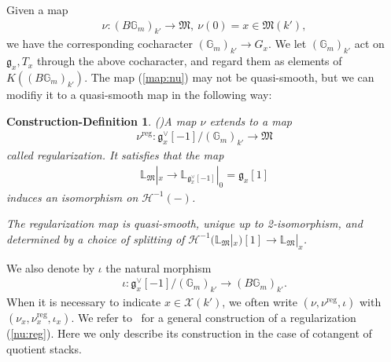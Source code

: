\documentclass [11pt,oneside,a4paper,mathscr]{amsart}
\newtheorem{consdef}[thm]{Construction-Definition}
\theoremstyle{definition}
\newcommand{\X}{\mathcal{X}}
\newcommand{\bgm}{B\mathbb{G}_m}
\begin{document}
Given a map 
\begin{align}\label{map:nu}\nu \colon (\bgm)_{k'} \to \mathfrak{M}, \ 
\nu(0)=x\in \mathfrak{M}(k'),
\end{align}
we have the corresponding cocharacter 
$(\mathbb{G}_m)_{k'} \to G_x$. 
We let $(\mathbb{G}_m)_{k'}$ act on $\mathfrak{g}_x, T_x$
through the above cocharacter, and regard them as elements of $K((\bgm)_{k'})$. 
The map (\ref{map:nu}) may not be quasi-smooth, but we can modifiy 
it to a quasi-smooth map in the following way:
\begin{consdef}\emph{(\cite[Construction~3.2.2]{HalpK32})}\label{def:construction}
A map $\nu$ extends to a map 
\begin{align}\label{nu:reg}
\nu^{\mathrm{reg}} \colon \mathfrak{g}_x^{\vee}[-1]/(\mathbb{G}_m)_{k'} \to \mathfrak{M}
\end{align}
called \textit{regularization}. It satisfies that the map 
\begin{align*}
    \mathbb{L}_{\mathfrak{M}}|_{x} \to 
    \mathbb{L}_{\mathfrak{g}_x^{\vee}[-1]}|_{0}=\mathfrak{g}_x[1]
\end{align*}
induces an isomorphism on $\mathcal{H}^{-1}(-)$. 

The regularization map is quasi-smooth, unique up to 2-isomorphism, 
and determined by a choice of splitting of 
$\mathcal{H}^{-1}(\mathbb{L}_{\mathfrak{M}}|_{x})[1] 
\to \mathbb{L}_{\mathfrak{M}}|_{x}$.
\end{consdef}

We also denote by $\iota$ the natural 
morphism 
\begin{align*}
    \iota \colon \mathfrak{g}_x^{\vee}[-1]/(\mathbb{G}_m)_{k'} \to 
    (\bgm)_{k'}.
\end{align*}
When it is necessary to indicate $x\in \X(k')$, we often write 
$(\nu, \nu^{\mathrm{reg}}, \iota)$ with $(\nu_x, \nu_x^{\mathrm{reg}}, \iota_x)$.
We refer to~\cite[Construction~3.2.2]{HalpK32} for a general construction of a regularization (\ref{nu:reg}). 
Here we only describe its construction in the case of cotangent 
of quotient stacks. 
\end{document}
